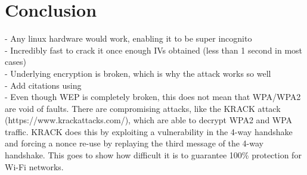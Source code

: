 \documentclass[10pt, titlepage]{article}
\begin{document}
\section{Conclusion}
- Any linux hardware would work, enabling it to be super incognito\\
- Incredibly fast to crack it once enough IVs obtained (less than 1 second in most cases)\\
- Underlying encryption is broken, which is why the attack works so well\\
- Add citations using \cite{klein}\\

- Even though WEP is completely broken, this does not mean that WPA/WPA2 are void of faults. There are compromising attacks, like the KRACK attack (https://www.krackattacks.com/), which are able to decrypt WPA2 and WPA traffic. KRACK does this by exploiting a vulnerability in the 4-way handshake and forcing a nonce re-use by replaying the third message of the 4-way handshake. This goes to show how difficult it is to guarantee 100\% protection for Wi-Fi networks.


\newpage

{}
\newpage


\end{document}

